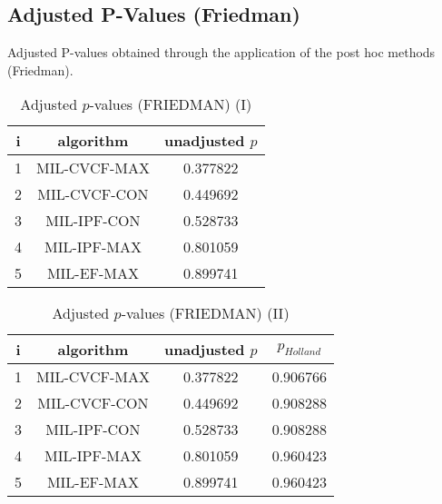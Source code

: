 \documentclass[a4paper,10pt]{article}
\begin{document}
\begin{landscape}
\newpage

\section{Adjusted P-Values (Friedman)}


Adjusted P-values obtained through the application of the post hoc methods (Friedman).

\begin{table}[!htp]
\centering\small
\begin{tabular}{ccc}
i&algorithm&unadjusted $p$\\
\hline1&MIL-CVCF-MAX&0.377822\\2&MIL-CVCF-CON&0.449692\\3&MIL-IPF-CON&0.528733\\4&MIL-IPF-MAX&0.801059\\5&MIL-EF-MAX&0.899741\\\hline
\end{tabular}
\caption{Adjusted $p$-values (FRIEDMAN) (I)}
\end{table}
\begin{table}[!htp]
\centering\small
\begin{tabular}{cccc}
i&algorithm&unadjusted $p$&$p_{Holland}$\\
\hline1&MIL-CVCF-MAX&0.377822&0.906766\\2&MIL-CVCF-CON&0.449692&0.908288\\3&MIL-IPF-CON&0.528733&0.908288\\4&MIL-IPF-MAX&0.801059&0.960423\\5&MIL-EF-MAX&0.899741&0.960423\\\hline
\end{tabular}
\caption{Adjusted $p$-values (FRIEDMAN) (II)}
\end{table}

\newpage
\end{landscape}
\end{document}
